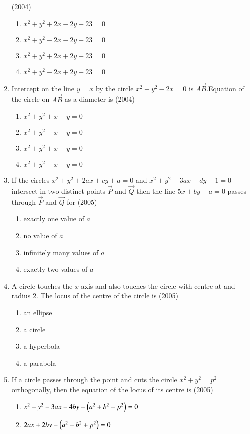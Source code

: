 \documentclass[journal,12pt,twocolumn]{IEEEtran}
\theoremstyle{remark}
\begin{document}
\begin{enumerate}[start=6]
\hfill{(2004)}
\begin{enumerate}
\item $x^2+y^2+2x-2y-23=0$
\item $x^2+y^2-2x-2y-23=0$
\item $x^2+y^2+2x+2y-23=0$
\item $x^2+y^2-2x+2y-23=0$
\end{enumerate}
\item Intercept on the line $y=x$ by the circle $x^2+y^2-2x=0$ is $\vec{AB}$.Equation of the circle on $\vec{AB}$ as a diameter is 
\hfill{(2004)}
\begin{enumerate}
\item $x^2+y^2+x-y=0$
\item $x^2+y^2-x+y=0$
\item $x^2+y^2+x+y=0$
\item $x^2+y^2-x-y=0$
\end{enumerate}
\item If the circles $x^2+y^2+2ax+cy+a=0$ and $x^2+y^2-3ax+dy-1=0$ intersect in two distinct points $\vec{P}$ and $\vec{Q}$ then the line $5x+by-a=0$ passes through $\vec{P}$ and $\vec{Q}$ for
\hfill{(2005)}
\begin{enumerate}
\item exactly one value of $a$
\item no value of $a$
\item infinitely many values of $a$
\item exactly two values of $a$
\end{enumerate}
\item A circle touches the $x$-axis and also touches the circle with centre at  and radius 2. The locus of the centre of the circle is
\hfill{(2005)}
\begin{multicols}{2}
\begin{enumerate}
\item an ellipse
\item a circle 
\item a hyperbola
\item a parabola
\end{enumerate}
\end{multicols}
\item If a circle passes through the point  and cuts the circle $x^2+y^2=p^2$ orthogonally, then the equation of the locus of its centre is 
\hfill{(2005)}
\begin{enumerate}
\item $x^2+y^2-3ax-4by+\left(a^2+b^2-p^2\right)=0$
\item $2ax+2by-\left(a^2-b^2+p^2\right)=0$

\end{enumerate}
\end{enumerate}
\end{document}
